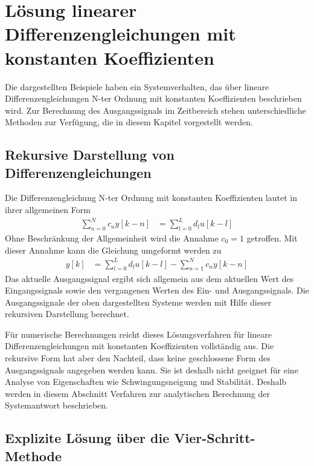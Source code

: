 \protect{}\label{_Ref369028047}{}

\section{Lösung linearer Differenzengleichungen mit konstanten Koeffizienten}\label{sec:4.3}

Die dargestellten Beispiele haben ein Systemverhalten, das über lineare Differenzengleichungen N-ter Ordnung mit konstanten Koeffizienten beschrieben wird. Zur Berechnung des Ausgangssignals im Zeitbereich stehen unterschiedliche Methoden zur Verfügung, die in diesem Kapitel vorgestellt werden.

\subsection{Rekursive Darstellung von Differenzengleichungen}\label{sec:rekursive-darstellung-von-differenzengleichungen}

Die Differenzengleichung N-ter Ordnung mit konstanten Koeffizienten lautet in ihrer allgemeinen Form
\begin{align}
\sum\limits_{n = 0}^{N}{c_{n}  y[ k - n]} &= \sum\limits_{l = 0}^{L}{d_{l}  u[ k - l]} \label{eq:4.45}
\end{align}
Ohne Beschränkung der Allgemeinheit wird die Annahme \(c_{0} = 1\) getroffen. Mit dieser Annahme kann die Gleichung umgeformt werden zu
\begin{align}
y[ k] &= \sum\limits_{l = 0}^{L}{d_{l}  u[ k - l]} - \sum\limits_{n = 1}^{N}{c_{n}  y[ k - n]} \label{eq:4.46}
\end{align}
Das aktuelle Ausgangssignal ergibt sich allgemein aus dem aktuellen Wert des Eingangssignals sowie den vergangenen Werten des Ein- und Ausgangssignals. Die Ausgangssignale der oben dargestellten Systeme werden mit Hilfe dieser rekursiven Darstellung berechnet.

Für numerische Berechnungen reicht dieses Lösungsverfahren für lineare Differenzengleichungen mit konstanten Koeffizienten vollständig aus. Die rekursive Form hat aber den Nachteil, dass keine geschlossene Form des Ausgangssignals angegeben werden kann. Sie ist deshalb nicht geeignet für eine Analyse von Eigenschaften wie Schwingungsneigung und Stabilität. Deshalb werden in diesem Abschnitt Verfahren zur analytischen Berechnung der Systemantwort beschrieben.

\subsection{Explizite Lösung über die Vier-Schritt-Methode}\label{sec:4.3.2}

